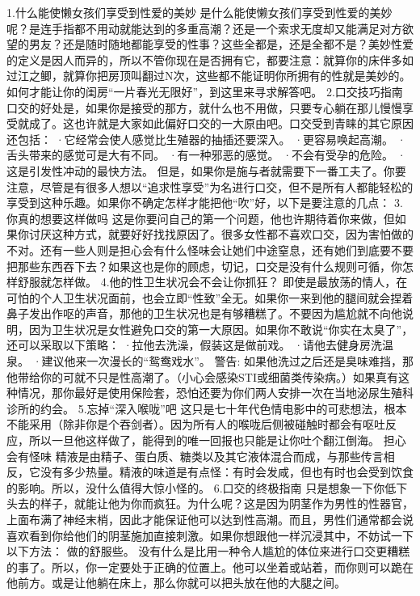 \documentclass[12pt,UTF8,openany]{ctexbook}
\begin{document}
1.什么能使懒女孩们享受到性爱的美妙
是什么能使懒女孩们享受到性爱的美妙呢？是连手指都不用动就能达到的多重高潮？还是一个索求无度却又能满足对方欲望的男友？还是随时随地都能享受的性事？这些全都是，还是全都不是？美妙性爱的定义是因人而异的，所以不管你现在是否拥有它，都要注意：就算你的床伴多如过江之鲫，就算你把房顶叫翻过N次，这些都不能证明你所拥有的性就是美妙的。
如何才能让你的闺房“一片春光无限好”，到这里来寻求解答吧。
2.口交技巧指南
口交的好处是，如果你是接受的那方，就什么也不用做，只要专心躺在那儿慢慢享受就成了。这也许就是大家如此偏好口交的一大原由吧。口交受到青睐的其它原因还包括：
·它经常会使人感觉比生殖器的抽插还要深入。
·更容易唤起高潮。
·舌头带来的感觉可是大有不同。
·有一种邪恶的感觉。
·不会有受孕的危险。
·这是引发性冲动的最快方法。
但是，如果你是施与者就需要下一番工夫了。你要注意，尽管是有很多人想以“追求性享受”为名进行口交，但不是所有人都能轻松的享受到这种乐趣。如果你不确定怎样才能把他“吹”好，以下是要注意的几点：
3.你真的想要这样做吗
这是你要问自己的第一个问题，他也许期待着你来做，但如果你讨厌这种方式，就要好好找找原因了。很多女性都不喜欢口交，因为害怕做的不对。还有一些人则是担心会有什么怪味会让她们中途窒息，还有她们到底要不要把那些东西吞下去？如果这也是你的顾虑，切记，口交是没有什么规则可循，你怎样舒服就怎样做。
4.他的性卫生状况会不会让你抓狂？
即使是最放荡的情人，在可怕的个人卫生状况面前，也会立即“性致”全无。如果你一来到他的腿间就会捏着鼻子发出作呕的声音，那他的卫生状况也是有够糟糕了。不要因为尴尬就不向他说明，因为卫生状况是女性避免口交的第一大原因。如果你不敢说“你实在太臭了”，还可以采取以下策略：
·拉他去洗澡，假装这是做前戏。
·请他去健身房洗温泉。
·建议他来一次漫长的“鸳鸯戏水”。
警告:
如果他洗过之后还是臭味难挡，那他带给你的可就不只是性高潮了。（小心会感染STI或细菌类传染病。）如果真有这种情况，那你最好是使用保险套，恐怕还要为你们两人安排一次在当地泌尿生殖科诊所的约会。
5.忘掉“深入喉咙”吧
这只是七十年代色情电影中的可悲想法，根本不能采用（除非你是个吞剑者）。因为所有人的喉咙后侧被碰触时都会有呕吐反应，所以一旦他这样做了，能得到的唯一回报也只能是让你吐个翻江倒海。
担心会有怪味
精液是由精子、蛋白质、糖类以及其它液体混合而成，与那些传言相反，它没有多少热量。精液的味道是有点怪：有时会发咸，但也有时也会受到饮食的影响。所以，没什么值得大惊小怪的。
6.口交的终极指南
只是想象一下你低下头去的样子，就能让他为你而疯狂。为什么呢？这是因为阴茎作为男性的性器官，上面布满了神经末梢，因此才能保证他可以达到性高潮。而且，男性们通常都会说喜欢看到你给他们的阴茎施加直接刺激。如果你想跟他一样沉浸其中，不妨试一下以下方法：
做的舒服些。
没有什么是比用一种令人尴尬的体位来进行口交更糟糕的事了。所以，你一定要处于正确的位置上。他可以坐着或站着，而你则可以跪在他前方。或是让他躺在床上，那么你就可以把头放在他的大腿之间。
\end{document}
